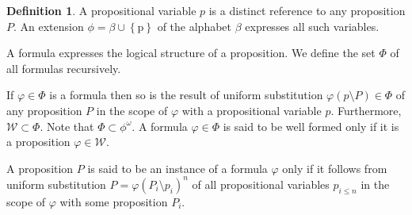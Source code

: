 \documentclass{amsbook}
\newcommand{\setsm}[1]{\left\{#1\right\}}
\newcommand{\wffs}{\mathcal W}
\theoremstyle{definition}
\newtheorem{dfn}{Definition}[section]
\begin{document}
\begin{dfn}
    A propositional variable $p$ is a distinct reference to any proposition $P$. An extension $\phi = \beta \cup \setsm{\mathrm p}$ of the alphabet $\beta$ expresses all such variables.

    A formula expresses the logical structure of a proposition. We define the set $\Phi$ of all formulas recursively.

    If $\varphi \in \Phi$ is a formula then so is the result of uniform substitution $\varphi(p \setminus P) \in \Phi$ of any proposition $P$ in the scope of $\varphi$ with a propositional variable $p$. Furthermore, $\wffs \subset \Phi$. Note that $\Phi \subset \phi^\omega$. A formula $\varphi \in \Phi$ is said to be well formed only if it is a proposition $\varphi \in \wffs$.

    A proposition $P$ is said to be an instance of a formula $\varphi$ only if it follows from uniform substitution $P = \varphi(P_i \setminus p_i)^n$ of all propositional variables $p_{i \leq n}$ in the scope of $\varphi$ with some proposition $P_i$.
\end{dfn}
\end{document}
